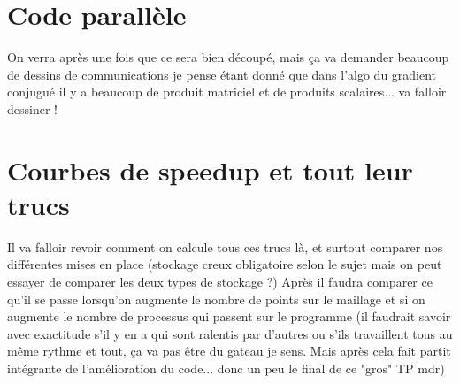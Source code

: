 \documentclass[french]{article}
\begin{document}
\section{Code parallèle}
On verra après une fois que ce sera bien découpé, mais ça va demander beaucoup de dessins de communications je pense étant donné que dans l'algo du gradient conjugué il y a beaucoup de produit matriciel et de produits scalaires... va falloir dessiner !  

\section{Courbes de speedup et tout leur trucs}
Il va falloir revoir comment on calcule tous ces trucs là, et surtout comparer nos différentes mises en place (stockage creux obligatoire selon le sujet mais on peut essayer de comparer les deux types de stockage ?) Après il faudra comparer ce qu'il se passe lorsqu'on augmente le nombre de points sur le maillage et si on augmente le nombre de processus qui passent sur le programme (il faudrait savoir avec exactitude s'il y en a qui sont ralentis par d'autres ou s'ils travaillent tous au même rythme et tout, ça va pas être du gateau je sens. Mais après cela fait partit intégrante de l'amélioration du code... donc un peu le final de ce "gros" TP mdr)
\end{document}
